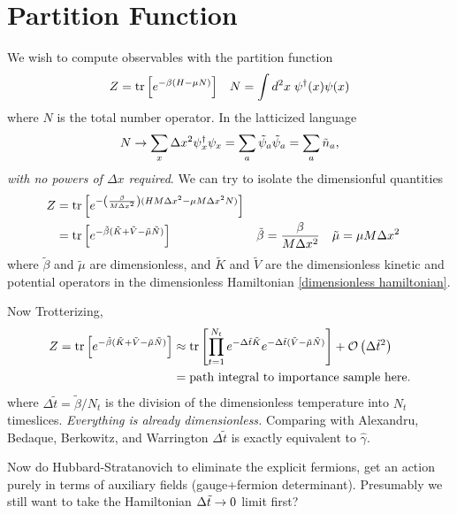 \section{Partition Function}

We wish to compute observables with the partition function
\begin{align}
	Z
	&=
	\text{tr}\left[e^{-\beta(H-\mu N)}\right]
	&
	N = \int d^2x\; \psi{}^{\dagger}(x)\psi(x)
\end{align}
where $N$ is the total number operator.
In the latticized language 
\begin{align}
	N
	\rightarrow
	\sum_x \Delta x^2 \psi{}^{\dagger}_x \psi_x
	=
	\sum_a \tilde{\psi}_a \tilde{\psi}_a
	=
	\sum_a \tilde{n}_a,
\end{align}
\emph{with no powers of $\Delta x$ required}.
We can try to isolate the dimensionful quantities
\begin{align}
	Z
	&=
	\text{tr}\left[e^{-\left(\frac{\beta}{M\Delta x^2}\right)(HM\Delta x^2 -\mu M \Delta x^2 N)}\right]
\\
	&=
	\text{tr}\left[e^{-\tilde{\beta}(\tilde{K}+\tilde{V}-\tilde{\mu} \tilde{N})}\right]
	&
	\tilde{\beta} &= \frac{\beta}{M \Delta x^2}
	&
	\tilde{\mu}   &= \mu M \Delta x^2
\end{align}
where $\tilde{\beta}$ and $\tilde{\mu}$ are dimensionless, and $\tilde{K}$ and $\tilde{V}$ are the dimensionless kinetic and potential operators in the dimensionless Hamiltonian \eqref{dimensionless hamiltonian}.

Now Trotterizing,
\begin{align}
	Z
	=
	\text{tr}\left[e^{-\tilde{\beta}(\tilde{K}+\tilde{V}-\tilde{\mu} \tilde{N})}\right]
	&\approx
	\text{tr}\left[\prod_{t=1}^{N_t} e^{-\Delta \tilde{t} \tilde{K}} e^{-\Delta\tilde{t}(\tilde{V}-\tilde{\mu}\tilde{N})}\right] + \mathcal{O}\left(\Delta\tilde{t}^2\right)
	\\
	&=
	\textrm{path integral to importance sample here.}
\end{align}
where $\Delta\tilde{t} = \tilde{\beta}/N_t$ is the division of the dimensionless temperature into $N_t$ timeslices.
\emph{Everything is already dimensionless.}
Comparing with Alexandru, Bedaque, Berkowitz, and Warrington $\Delta\tilde{t}$ is exactly equivalent to $\hat{\gamma}$.

Now do Hubbard-Stratanovich to eliminate the explicit fermions, get an action purely in terms of auxiliary fields (gauge+fermion determinant).
Presumably we still want to take the Hamiltonian $\Delta\tilde{t}\rightarrow0$ limit first?
